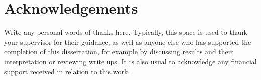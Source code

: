 
\chapter*{Acknowledgements}

Write any personal words of thanks here.
Typically, this space is used to thank your supervisor for their guidance,
as well as anyone else who has supported the completion of this dissertation,
for example by discussing results and their interpretation or reviewing
write ups.
It is also usual to acknowledge any financial support received in relation to
this work.
